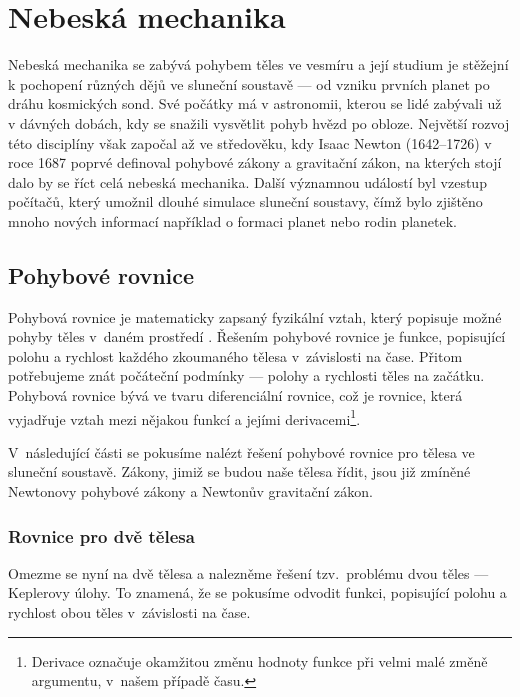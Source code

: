 \documentclass[A4paper, 12pt, oneside]{book}
\begin{document}
\chapter{Nebeská mechanika} \label{ch:celmech}
Nebeská mechanika se zabývá pohybem těles ve vesmíru a její studium je stěžejní k pochopení různých dějů ve sluneční soustavě --- od vzniku prvních planet po dráhu kosmických sond. Své počátky má v astronomii, kterou se lidé zabývali už v dávných dobách, kdy se snažili vysvětlit pohyb hvězd po obloze. Největší rozvoj této disciplíny však započal až ve středověku, kdy Isaac Newton (1642--1726) v roce 1687 poprvé definoval pohybové zákony a gravitační zákon, na kterých stojí dalo by se říct celá nebeská mechanika. Další významnou událostí byl vzestup počítačů, který umožnil dlouhé simulace sluneční soustavy, čímž bylo zjištěno mnoho nových informací například o formaci planet nebo rodin planetek.

\section{Pohybové rovnice}
Pohybová rovnice je matematicky zapsaný fyzikální vztah, který popisuje možné pohyby těles v~daném prostředí \cite{wiki:eqm}. Řešením pohybové rovnice je funkce, popisující polohu a rychlost každého zkoumaného tělesa v~závislosti na čase. Přitom potřebujeme znát počáteční podmínky --- polohy a rychlosti těles na začátku. Pohybová rovnice bývá ve tvaru diferenciální rovnice, což je rovnice, která vyjadřuje vztah mezi nějakou funkcí a jejími derivacemi\footnote{Derivace označuje okamžitou změnu hodnoty funkce při velmi malé změně argumentu, v~našem případě času.}.

V~následující části se pokusíme nalézt řešení pohybové rovnice pro tělesa ve sluneční soustavě. Zákony, jimiž se budou naše tělesa řídit, jsou již zmíněné Newtonovy pohybové zákony a Newtonův gravitační zákon.
\subsection{Rovnice pro dvě tělesa} \label{sec:2body}
Omezme se nyní na dvě tělesa a nalezněme řešení tzv.\ problému dvou těles --- Keplerovy úlohy. To znamená, že se pokusíme odvodit funkci, popisující polohu a rychlost obou těles v~závislosti na čase. 
\end{document}
